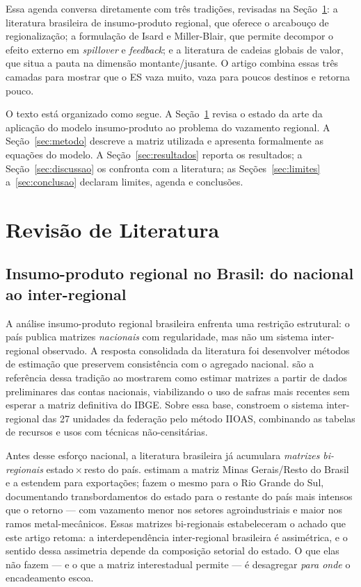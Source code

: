 \documentclass[11pt,a4paper]{article}
\begin{document}
Essa agenda conversa diretamente com três tradições, revisadas na
Seção~\ref{sec:revisao}: a literatura brasileira de insumo-produto regional,
que oferece o arcabouço de regionalização; a formulação de Isard e
Miller-Blair, que permite decompor o efeito externo em \emph{spillover} e
\emph{feedback}; e a literatura de cadeias globais de valor, que situa a pauta
na dimensão montante/jusante. O artigo combina essas três camadas para mostrar
que o ES vaza muito, vaza para poucos destinos e retorna pouco.

O texto está organizado como segue. A Seção~\ref{sec:revisao} revisa o estado
da arte da aplicação do modelo insumo-produto ao problema do vazamento
regional. A Seção~\ref{sec:metodo} descreve a matriz utilizada e apresenta
formalmente as equações do modelo. A Seção~\ref{sec:resultados} reporta os
resultados; a Seção~\ref{sec:discussao} os confronta com a literatura; as
Seções~\ref{sec:limites} a~\ref{sec:conclusao} declaram limites, agenda e
conclusões.

\section{Revisão de Literatura}
\label{sec:revisao}

\subsection{Insumo-produto regional no Brasil: do nacional ao inter-regional}
A análise insumo-produto regional brasileira enfrenta uma restrição
estrutural: o país publica matrizes \emph{nacionais} com regularidade, mas não
um sistema inter-regional observado. A resposta consolidada da literatura foi
desenvolver métodos de estimação que preservem consistência com o agregado
nacional. \citet{guilhoto2005estimacao} são a referência dessa tradição ao
mostrarem como estimar matrizes a partir de dados preliminares das contas
nacionais, viabilizando o uso de safras mais recentes sem esperar a matriz
definitiva do IBGE. Sobre essa base, \citet{haddad2017iioas} constroem o
sistema inter-regional das 27 unidades da federação pelo método IIOAS,
combinando as tabelas de recursos e usos com técnicas não-censitárias.

Antes desse esforço nacional, a literatura brasileira já acumulara
\emph{matrizes bi-regionais} estado\,$\times$\,resto do país.
\citet{domingues2002matriz} estimam a matriz Minas Gerais/Resto do Brasil e a
estendem para exportações; \citet{porsse2008matriz} fazem o mesmo para o Rio
Grande do Sul, documentando transbordamentos do estado para o restante do país
mais intensos que o retorno --- com vazamento menor nos setores
agroindustriais e maior nos ramos metal-mecânicos. Essas matrizes bi-regionais
estabeleceram o achado que este artigo retoma: a interdependência
inter-regional brasileira é assimétrica, e o sentido dessa assimetria depende
da composição setorial do estado. O que elas não fazem --- e o que a matriz
interestadual permite --- é desagregar \emph{para onde} o encadeamento escoa.
\end{document}
